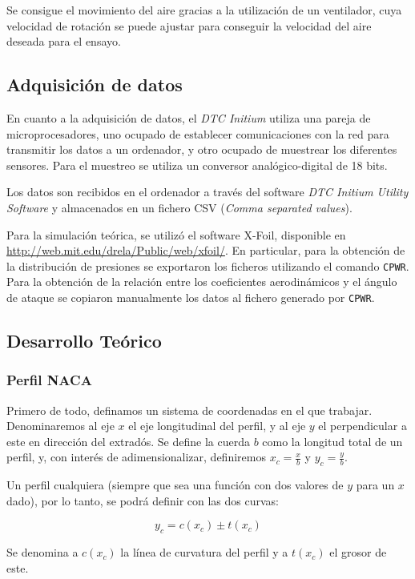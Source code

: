 \documentclass{article}
\begin{document}
Se consigue el movimiento del aire gracias a la utilización de un ventilador, cuya velocidad de rotación se puede ajustar
para conseguir la velocidad del aire deseada para el ensayo.

\subsection{Adquisición de datos}

En cuanto a la adquisición de datos, el \textit{DTC Initium} utiliza una pareja de microprocesadores, uno ocupado de establecer
comunicaciones con la red para transmitir los datos a un ordenador, y otro ocupado de muestrear los diferentes sensores. 
Para el muestreo se utiliza un conversor analógico-digital de 18 bits. 

Los datos son recibidos en el ordenador a través del software \textit{DTC Initium Utility Software} y almacenados en un fichero
CSV (\textit{Comma separated values}). 

Para la simulación teórica, se utilizó el software X-Foil, disponible en \url{http://web.mit.edu/drela/Public/web/xfoil/}.
En particular, para la obtención de la distribución de presiones se exportaron los ficheros utilizando el comando
\verb+CPWR+. Para la obtención de la relación entre los coeficientes aerodinámicos y el ángulo de ataque se 
copiaron manualmente los datos al fichero generado por \verb+CPWR+.

\subsection{Desarrollo Teórico}

\subsubsection{Perfil NACA}

Primero de todo, definamos un sistema de coordenadas en el que trabajar. Denominaremos al eje $x$ el eje longitudinal
del perfil, y al eje $y$ el perpendicular a este en dirección del extradós. Se define la cuerda $b$ como la longitud total
de un perfil, y, con interés de adimensionalizar, definiremos $x_c = \frac{x}{b}$ y $y_c = \frac{y}{b}$.

Un perfil cualquiera (siempre que sea una función con dos valores de $y$ para un $x$ dado), por lo tanto, se podrá definir 
con las dos curvas:

$$y_c = c(x_c) \pm t(x_c)$$

Se denomina a $c(x_c)$ la línea de curvatura del perfil y a $t(x_c)$ el grosor de este. 
\end{document}
